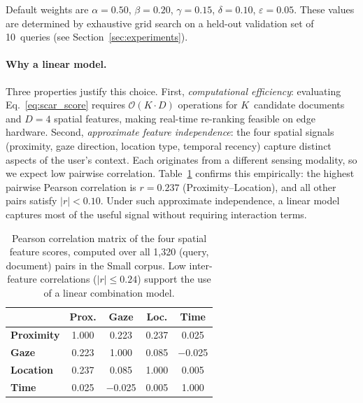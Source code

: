 \documentclass[journal]{IEEEtran}
\begin{document}
\noindent
Default weights are
$\alpha{=}0.50$,
$\beta{=}0.20$,
$\gamma{=}0.15$,
$\delta{=}0.10$,
$\varepsilon{=}0.05$.
These values are determined by exhaustive grid search on a held-out
validation set of 10~queries (see Section~\ref{sec:experiments}).

\paragraph{Why a linear model.}
Three properties justify this choice.
First, \emph{computational efficiency}: evaluating
Eq.~\eqref{eq:scar_score} requires $\mathcal{O}(K \cdot D)$
operations for $K$~candidate documents and $D{=}4$ spatial features,
making real-time re-ranking feasible on edge hardware.
Second, \emph{approximate feature independence}: the four spatial
signals (proximity, gaze direction, location type, temporal recency)
capture distinct aspects of the user's context.  Each originates from
a different sensing modality, so we expect low pairwise correlation.
Table~\ref{tab:correlation} confirms this empirically: the highest
pairwise Pearson correlation is $r{=}0.237$ (Proximity--Location),
and all other pairs satisfy $|r| < 0.10$.  Under such approximate
independence, a linear model captures most of the useful signal
without requiring interaction terms.

\begin{table}[htbp]
\centering
\caption{Pearson correlation matrix of the four spatial feature scores, computed over all 1{,}320 (query, document) pairs in the Small corpus. Low inter-feature correlations ($|r| \leq 0.24$) support the use of a linear combination model.}
\label{tab:correlation}
\begin{tabular}{lcccc}
\hline
& \textbf{Prox.} & \textbf{Gaze} & \textbf{Loc.} & \textbf{Time} \\
\hline
\textbf{Proximity} & 1.000 & 0.223 & 0.237 & 0.025 \\
\textbf{Gaze}      & 0.223 & 1.000 & 0.085 & $-$0.025 \\
\textbf{Location}  & 0.237 & 0.085 & 1.000 & 0.005 \\
\textbf{Time}      & 0.025 & $-$0.025 & 0.005 & 1.000 \\
\hline
\end{tabular}
\end{table}
\end{document}
